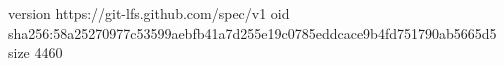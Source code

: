 version https://git-lfs.github.com/spec/v1
oid sha256:58a25270977c53599aebfb41a7d255e19c0785eddcace9b4fd751790ab5665d5
size 4460
